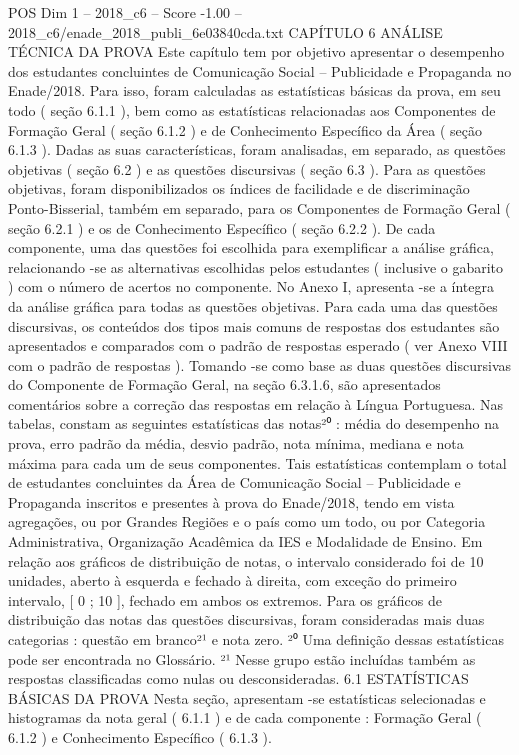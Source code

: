 \begin{textsample}{POS Dim 1 – 2018\_c6 – Score -1.00 – 2018\_c6/enade\_2018\_publi\_6e03840cda.txt}  \label{ex:f1_pos_242}
CAPÍTULO 6 ANÁLISE TÉCNICA DA PROVA Este capítulo tem por objetivo apresentar o desempenho dos estudantes concluintes de Comunicação Social – Publicidade e Propaganda no Enade/2018.
Para isso, foram calculadas as estatísticas básicas da prova, em seu todo ( seção 6.1.1 ), bem como as estatísticas relacionadas aos Componentes de Formação Geral ( seção 6.1.2 ) e de Conhecimento Específico da Área ( seção 6.1.3 ).
Dadas as suas características, foram analisadas, em separado, as questões objetivas ( seção 6.2 ) e as questões discursivas ( seção 6.3 ).
Para as questões objetivas, foram disponibilizados os índices de facilidade e de discriminação Ponto-Bisserial, também em separado, para os Componentes de Formação Geral ( seção 6.2.1 ) e os de Conhecimento Específico ( seção 6.2.2 ).
De cada componente, uma das questões foi escolhida para exemplificar a análise gráfica, relacionando -se as alternativas escolhidas pelos estudantes ( inclusive o gabarito ) com o número de acertos no componente.
No Anexo I, apresenta -se a íntegra da análise gráfica para todas as questões objetivas.
Para cada uma das questões discursivas, os conteúdos dos tipos mais comuns de respostas dos estudantes são apresentados e comparados com o padrão de respostas esperado ( ver Anexo VIII com o padrão de respostas ).
Tomando -se como base as duas questões discursivas do Componente de Formação Geral, na seção 6.3.1.6, são apresentados comentários sobre a correção das respostas em relação à Língua Portuguesa.
Nas tabelas, constam as seguintes estatísticas das notas²⁰ : média do desempenho na prova, erro padrão da média, desvio padrão, nota mínima, mediana e nota máxima para cada um de seus componentes.
Tais estatísticas contemplam o total de estudantes concluintes da Área de Comunicação Social – Publicidade e Propaganda inscritos e presentes à prova do Enade/2018, tendo em vista agregações, ou por Grandes Regiões e o país como um todo, ou por Categoria Administrativa, Organização Acadêmica da IES e Modalidade de Ensino.
Em relação aos gráficos de distribuição de notas, o intervalo considerado foi de 10 unidades, aberto à esquerda e fechado à direita, com exceção do primeiro intervalo, [ 0 ; 10 ], fechado em ambos os extremos.
Para os gráficos de distribuição das notas das questões discursivas, foram consideradas mais duas categorias : questão em branco²¹ e nota zero. ²⁰ Uma definição dessas estatísticas pode ser encontrada no Glossário. ²¹ Nesse grupo estão incluídas também as respostas classificadas como nulas ou desconsideradas. 6.1 ESTATÍSTICAS BÁSICAS DA PROVA Nesta seção, apresentam -se estatísticas selecionadas e histogramas da nota geral ( 6.1.1 ) e de cada componente : Formação Geral ( 6.1.2 ) e Conhecimento Específico ( 6.1.3 ).

\end{textsample}
